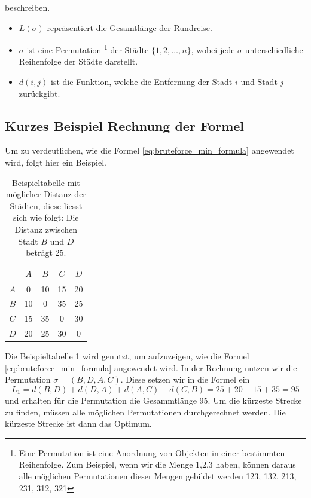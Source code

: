 beschreiben.
\begin{itemize}
    \item \( L(\sigma) \) repräsentiert die Gesamtlänge der Rundreise.
    \item \( \sigma \) ist eine Permutation
          \footnote{
              Eine Permutation ist eine Anordnung von Objekten in einer bestimmten Reihenfolge.
              Zum Beispiel, wenn wir die Menge {1,2,3} haben, können daraus alle möglichen 
              Permutationen dieser Mengen gebildet werden 123, 132, 213, 231, 312, 321 
          }
          der Städte \( \{1, 2, \ldots, n\} \),
          wobei jede \( \sigma \) unterschiedliche Reihenfolge der Städte darstellt.
    \item \( d(i, j) \) ist die Funktion, welche die Entfernung der Stadt \( i \) und
          Stadt \( j \) zurückgibt.
\end{itemize}

\subsection{Kurzes Beispiel Rechnung der Formel
    \label{buch:paper:varalg:subsection:bruteforce_calculate}}
Um zu verdeutlichen, wie die Formel \ref{eq:bruteforce_min_formula}
angewendet wird, folgt hier ein Beispiel.
\begin{table}
    \centering
    \begin{tabular}{|c|c|c|c|c|}
        \hline
            & $A$ & $B$ & $C$ & $D$ \\ \hline
        $A$ & 0   & 10  & 15  & 20  \\ \hline
        $B$ & 10  & 0   & 35  & 25  \\ \hline
        $C$ & 15  & 35  & 0   & 30  \\ \hline
        $D$ & 20  & 25  & 30  & 0   \\ \hline
    \end{tabular}
    \caption{
        Beispieltabelle mit möglicher Distanz der Städten, diese liesst sich wie folgt:
        Die Distanz zwischen Stadt $B$ und $D$ beträgt 25.
    }
    \label{tab:example_bruteforce_cities}
\end{table}
Die Beispieltabelle \ref{tab:example_bruteforce_cities} wird genutzt, um aufzuzeigen, wie
die Formel \ref{eq:bruteforce_min_formula} angewendet wird. In der Rechnung nutzen wir die
Permutation $\sigma = (B, D, A, C)$. Diese setzen wir in die Formel ein 
\begin{equation}
    L_1 = d(B, D) + d(D, A) + d(A, C) + d(C, B)
    =
    25 + 20 + 15 + 35 = 95
    \label{eq:bruteforce_min_formula}
\end{equation}
und erhalten für die Permutation die Gesammtlänge 95. Um die kürzeste Strecke zu finden,
müssen alle möglichen Permutationen durchgerechnet werden. Die kürzeste Strecke ist dann
das Optimum. 

